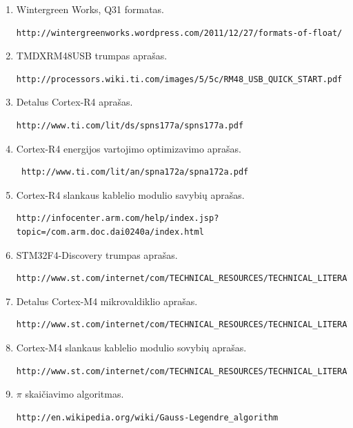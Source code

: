 \documentclass[a4paper, 12pt]{article} %
\begin{document}
\begin{onehalfspacing}






\begin{enumerate}
\item  Wintergreen Works, Q31 formatas. \begin{verbatim}http://wintergreenworks.wordpress.com/2011/12/27/formats-of-float/\end{verbatim}
\item TMDXRM48USB trumpas apra\v{s}as. \begin{verbatim}http://processors.wiki.ti.com/images/5/5c/RM48_USB_QUICK_START.pdf\end{verbatim}
\item Detalus Cortex-R4 apra\v{s}as. \begin{verbatim}http://www.ti.com/lit/ds/spns177a/spns177a.pdf\end{verbatim}
\item Cortex-R4 energijos vartojimo optimizavimo apra\v{s}as.\begin{verbatim} http://www.ti.com/lit/an/spna172a/spna172a.pdf\end{verbatim}
\item Cortex-R4 slankaus kablelio modulio savybi\k{u} apra\v{s}as. \begin{verbatim}http://infocenter.arm.com/help/index.jsp?topic=/com.arm.doc.dai0240a/index.html\end{verbatim}
\item STM32F4-Discovery trumpas apra\v{s}as. \begin{verbatim}http://www.st.com/internet/com/TECHNICAL_RESOURCES/TECHNICAL_LITERATURE/DATA_BRIEF/DM00037955.pdf\end{verbatim}
\item Detalus Cortex-M4 mikrovaldiklio apra\v{s}as. \begin{verbatim}http://www.st.com/internet/com/TECHNICAL_RESOURCES/TECHNICAL_LITERATURE/DATASHEET/DM00037051.pdf\end{verbatim}
\item Cortex-M4 slankaus kablelio modulio sovybi\k{u} apra\v{s}as. \begin{verbatim}http://www.st.com/internet/com/TECHNICAL_RESOURCES/TECHNICAL_LITERATURE/DATASHEET/DM00037051.pdf\end{verbatim}
\item $\pi$ skai\v{c}iavimo algoritmas. \begin{verbatim}http://en.wikipedia.org/wiki/Gauss-Legendre_algorithm\end{verbatim}
\end{enumerate}


\end{onehalfspacing}
\end{document}
